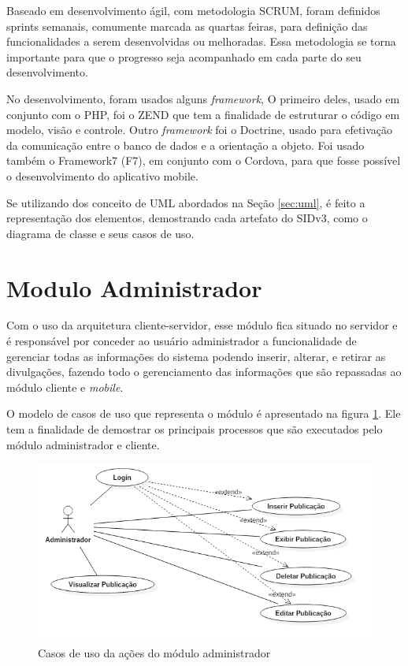 Baseado em desenvolvimento ágil, com metodologia SCRUM, foram definidos sprints semanais, comumente marcada as quartas feiras, para definição das funcionalidades a serem desenvolvidas ou melhoradas. Essa metodologia se torna importante para que o progresso seja acompanhado em cada parte do seu desenvolvimento.

No desenvolvimento, foram usados alguns \textit{framework}, O primeiro deles, usado em conjunto com o PHP, foi o ZEND que tem a finalidade de estruturar o código em modelo, visão e controle. Outro \textit{framework} foi o Doctrine, usado para efetivação da comunicação entre o banco de dados e a orientação a objeto. Foi usado também o Framework7 (F7), em conjunto com o Cordova, para que fosse possível o desenvolvimento do aplicativo mobile. 

Se utilizando dos conceito de UML abordados na Seção \ref{sec:uml}, é  feito a representação dos elementos, demostrando cada artefato do SIDv3, como o diagrama de classe e seus casos de uso.

\section{Modulo Administrador}
Com o uso da arquitetura cliente-servidor, esse módulo fica situado no servidor e é responsável por conceder ao usuário administrador a funcionalidade de gerenciar todas as informações do sistema podendo inserir, alterar, e retirar as divulgações, fazendo todo o gerenciamento das informações que são repassadas ao módulo cliente e \textit{mobile}.

O modelo de casos de uso que representa o módulo é apresentado na figura \ref{fig:casosDeUsoADM}. Ele tem a finalidade de demostrar os principais processos que são executados pelo módulo administrador e cliente. 

\begin{figure}[H]
\centering
\includegraphics[scale=0.6]{figuras/casosDeUsoADM}
\caption{Casos de uso da ações do módulo administrador}
\label{fig:casosDeUsoADM}
\end{figure}

